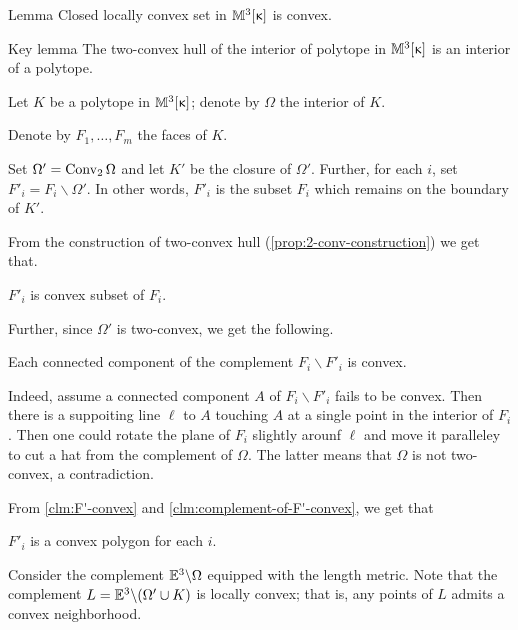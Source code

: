 \begin{thm}{Lemma}
Closed locally convex set in $\mathbb{M}_{{}}^{3}[{\upkappa}]$ is convex. 
\end{thm}




\begin{thm}{Key lemma}
The two-convex hull of the interior of polytope in $\mathbb{M}_{{}}^{3}[{\upkappa}]$
is an interior of a polytope.
\end{thm}

Let $K$ be a polytope in $\mathbb{M}_{{}}^{3}[{\upkappa}]$;
denote by $\Omega$ the interior of $K$.

Denote by $F_1,\dots,F_m$ the faces of $K$.

Set $\Omega'=\mathop{\rm Conv}\nolimits_2\Omega$ and let $K'$ be the closure of $\Omega'$.
Further, 
for each $i$, 
set $F'_i=F_i\backslash \Omega'$.
In other words, 
$F'_i$ is the subset $F_i$ 
which remains on the boundary of $K'$.

From the construction of two-convex hull (\ref{prop:2-conv-construction})
we get that.

\begin{clm}{}\label{clm:F'-convex}
$F'_i$ is convex subset of $F_i$.
\end{clm}

Further, since $\Omega'$ is two-convex,
we get the following.

\begin{clm}{}\label{clm:complement-of-F'-convex}
Each connected component of the complement $F_i\backslash F'_i$ is convex.
\end{clm}

Indeed, assume a connected component $A$ of $F_i\backslash F'_i$ fails to be convex.
Then there is a suppoiting line $\ell$ to $A$ touching $A$ at a single point in the interior of $F_i$.
Then one could rotate the plane of $F_i$ slightly arounf $\ell$ and move it paralleley to cut a hat from the complement of $\Omega$.
The latter means that $\Omega$ is not two-convex, 
a contradiction.
\claimqeds

From \ref{clm:F'-convex} and \ref{clm:complement-of-F'-convex}, we get that 

\begin{clm}{}$F'_i$ is a convex polygon for each $i$.
\end{clm}

Consider the complement 
$\mathbb{E}^3\backslash \Omega$ 
equipped with the length metric.
Note that the complement $L=\EE^3\backslash (\Omega'\cup K)$
is locally convex;
that is, any points of $L$ admits a convex neighborhood.

